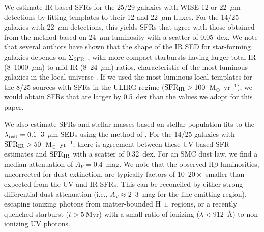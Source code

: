 \documentclass[apj]{emulateapj}
\newcommand{\hii}{\textrm{H}~\textsc{ii}}
\newcommand{\msun}{M$_{\odot}$}
\newcommand{\lrest}{\lambda_{\textnormal{\scriptsize{rest}}}}
\newcommand{\sigmasfr}{\Sigma_{\textnormal{\scriptsize{SFR}}}}
\newcommand{\sfrir}{\textnormal{SFR}_{\textnormal{\scriptsize{IR}}}}
\begin{document}

We estimate IR-based SFRs for the 25/29 galaxies with WISE 12 or
22~$\mu$m detections by fitting \citet{cha01} templates to their 12
and 22~$\mu$m fluxes.  For the 14/25 galaxies with 22~$\mu$m
detections, this yields SFRs that agree with those obtained from the
\citet{ruj12} method based on 24~$\mu$m luminosity with a scatter of
0.05~dex.  We note that several authors have shown that the shape of
the IR SED for star-forming galaxies depends on $\sigmasfr$
\citep{ruj11,elb11}, with more compact starbursts having larger
total-IR (8--1000~$\mu$m) to mid-IR (8--24~$\mu$m) ratios,
characteristic of the most luminous galaxies in the local universe
\citep{rie09}.  If we used the most luminous local templates for the
8/25 sources with SFRs in the ULIRG regime
($\sfrir>100$~\msun~yr$^{-1}$), we would obtain SFRs that are larger
by 0.5~dex than the values we adopt for this paper.

We also estimate SFRs and stellar masses based on stellar population
fits to the $\lrest=0.1$--3~$\mu$m SEDs using the method of
\citet{mou11}.  For the 14/25 galaxies with
$\sfrir>50$~\msun~yr$^{-1}$, there is agreement between these UV-based
SFR estimates and $\sfrir$ with a scatter of 0.32~dex.  For an SMC
dust law, we find a median attenuation of $A_V=0.4$~mag.  We note that
the observed H$\beta$ luminosities, uncorrected for dust extinction,
are typically factors of 10--$20\times$ smaller than expected from the
UV and IR SFRs.  This can be reconciled by either strong differential
dust attenuation (i.e., $A_V\approx2$--3~mag for the line-emitting
region), escaping ionizing photons from matter-bounded \hii\ regions,
or a recently quenched starburst ($t>5~$Myr) with a small ratio of
ionizing ($\lambda<912$~\AA) to non-ionizing UV photons.
\end{document}
